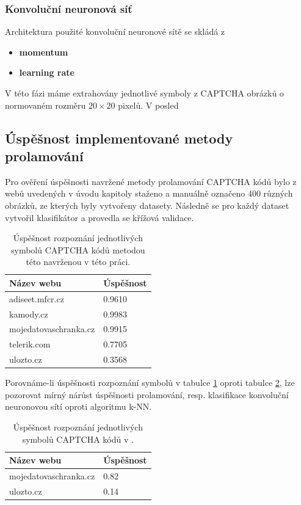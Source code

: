 \documentclass[
  field=ainfp,
  master=true,
  biblatex,
  sourcecodes=false,
  theorems=false,
  glossaries,
  index
]{kidiplom}
\begin{document}
\subsubsection*{Konvoluční neuronová síť}
Architektura použité konvoluční neuronové sítě se skládá z 

\begin{itemize}
\item \textbf{momentum}
\item \textbf{learning rate}
\end{itemize}
V této fázi máme extrahovány jednotlivé symboly z CAPTCHA obrázků o normovaném rozměru $20\times20$ pixelů. V posled

\subsection{Úspěšnost implementované metody prolamování}
Pro ověření úspěšnosti navržené metody prolamování CAPTCHA kódů bylo z webů uvedených v úvodu kapitoly staženo a manuálně označeno 400 různých obrázků, ze kterých byly vytvořeny datasety. Následně se pro každý dataset vytvořil klasifikátor a provedla se křížová validace.  

\begin{table}[H]
\centering
\begin{tabular}{|l|l|}
\hline
\textbf{Název webu} & \textbf{Úspěšnost}
\\ \hline
adiseet.mfcr.cz & 0.9610
\\ \hline
kamody.cz & 0.9983
\\ \hline
mojedatovaschranka.cz & 0.9915
\\ \hline
telerik.com & 0.7705
\\ \hline
ulozto.cz & 0.3568
\\ \hline
\end{tabular}
\caption{Úspěšnost rozpoznání jednotlivých symbolů CAPTCHA kódů metodou této navrženou v této práci.}
\label{succesful_rate_mine}
\end{table}

Porovnáme-li úspěšnosti rozpoznání symbolů v tabulce \ref{succesful_rate_mine} oproti tabulce \ref{succesful_rate_mimic}, lze pozorovat mírný nárůst úspěšnosti prolamování, resp. klasifikace konvoluční neuronovou sítí oproti algoritmu k-NN.

\begin{table}[H]
\centering
\begin{tabular}{|l|l|}
\hline
\textbf{Název webu} & \textbf{Úspěšnost}
\\ \hline
mojedatovaschranka.cz & 0.82
\\ \hline
ulozto.cz & 0.14
\\ \hline
\end{tabular}
\caption{Úspěšnost rozpoznání jednotlivých symbolů CAPTCHA kódů v \citep{Kopp2016HowTM}.}
\label{succesful_rate_mimic}
\end{table}
\end{document}
